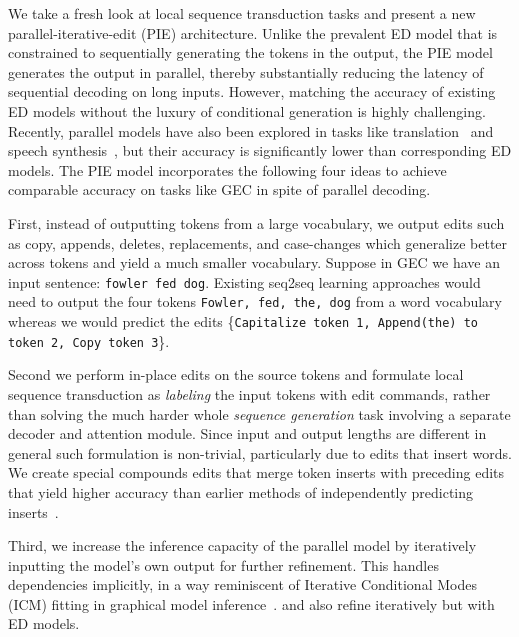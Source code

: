 \documentclass[11pt,a4paper]{article}
\begin{document}
We take a fresh look at local sequence transduction tasks and present a new parallel-iterative-edit (PIE) architecture.  Unlike the prevalent ED model that is constrained to sequentially generating the tokens in the output, the PIE model generates the output in parallel,  thereby substantially reducing the latency of sequential decoding on long inputs.
However, matching the accuracy of existing ED models without the luxury of conditional generation is highly challenging. Recently, parallel models have also been explored in tasks like translation~\cite{Stern2018,Lee2018,gu2018,kaiser18a} and speech synthesis~\cite{oord18a}, but their accuracy is significantly lower than corresponding ED models. The PIE model incorporates the following four ideas to achieve comparable accuracy on tasks like GEC in spite of parallel decoding.

First, instead of outputting tokens from a large vocabulary, we output edits such as copy, appends, deletes, replacements, and case-changes which generalize better across tokens and yield a much smaller vocabulary. Suppose in GEC we have an input sentence: {\tt fowler fed dog}. Existing seq2seq learning approaches would need to output the four tokens {\tt Fowler, fed, the, dog} from a word vocabulary whereas we would predict the edits \{{\tt Capitalize token 1, Append(the) to token 2, Copy token 3}\}. 

Second we perform in-place edits on the source tokens and formulate local sequence transduction as {\em labeling} the input tokens with edit commands, rather than solving the much harder whole \emph{sequence generation} task involving a separate decoder and attention module.
Since input and output lengths are different in general such formulation is non-trivial, particularly due to edits that insert words.  We create special compounds edits that merge token inserts with preceding edits that yield higher accuracy than earlier methods of independently predicting inserts~\cite{Ribeiro2018,Lee2018}.  

Third, we increase the inference capacity of the parallel model by  iteratively inputting the model's own output for further refinement.  This handles dependencies implicitly, in a way reminiscent of Iterative Conditional Modes (ICM) fitting in graphical model inference~\cite{daphneBook}. \citet{lichtarge2019} and \citet{ge2018reaching} also refine iteratively but with ED models.
\end{document}
